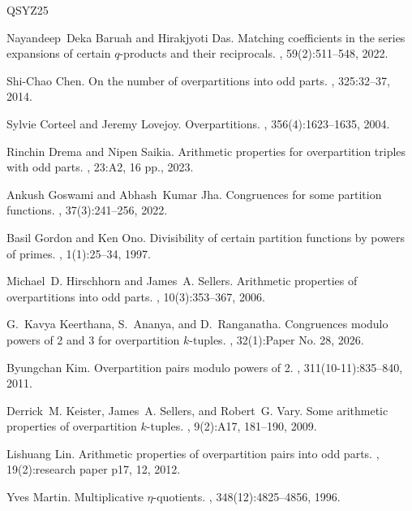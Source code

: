 \documentclass[12pt,reqno]{amsart}
\numberwithin{equation}{section}
\begin{document}
\begin{thebibliography}{QSYZ25}

Nayandeep~Deka Baruah and Hirakjyoti Das.
\newblock Matching coefficients in the series expansions of certain {{\(q\)}}-products and their reciprocals.
, 59(2):511--548, 2022.

Shi-Chao Chen.
\newblock On the number of overpartitions into odd parts.
, 325:32--37, 2014.

Sylvie Corteel and Jeremy Lovejoy.
\newblock Overpartitions.
, 356(4):1623--1635, 2004.

Rinchin Drema and Nipen Saikia.
\newblock Arithmetic properties for overpartition triples with odd parts.
, 23:{A}2, 16 pp., 2023.

Ankush Goswami and Abhash~Kumar Jha.
\newblock Congruences for some partition functions.
, 37(3):241--256, 2022.

Basil Gordon and Ken Ono.
\newblock Divisibility of certain partition functions by powers of primes.
, 1(1):25--34, 1997.

Michael~D. Hirschhorn and James~A. Sellers.
\newblock Arithmetic properties of overpartitions into odd parts.
, 10(3):353--367, 2006.

G.~Kavya Keerthana, S.~Ananya, and D.~Ranganatha.
\newblock Congruences modulo powers of 2 and 3 for overpartition {$k$}-tuples.
, 32(1):Paper No. 28, 2026.

Byungchan Kim.
\newblock Overpartition pairs modulo powers of 2.
, 311(10-11):835--840, 2011.

Derrick~M. Keister, James~A. Sellers, and Robert~G. Vary.
\newblock Some arithmetic properties of overpartition {{\(k\)}}-tuples.
, 9(2):{A}17, 181--190, 2009.

Lishuang Lin.
\newblock Arithmetic properties of overpartition pairs into odd parts.
, 19(2):research paper p17, 12, 2012.

Yves Martin.
\newblock Multiplicative {{\(\eta\)}}-quotients.
, 348(12):4825--4856, 1996.


\end{thebibliography}
\end{document}
